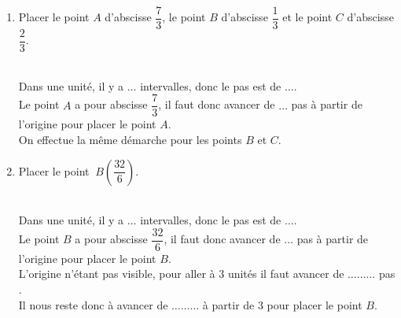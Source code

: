 \begin{Exemple}
\begin{enumerate}
\item Placer le point $A$ d'abscisse $\dfrac{7}{3}$, le point $B$ d'abscisse $\dfrac{1}{3}$ et le point $C$ d'abscisse $\dfrac{2}{3}$.


\bigskip
  \\
Dans une unité, il y a $\ldots$ intervalles, donc le pas est de $\ldots$.\\
Le point $A$ a pour abscisse $\dfrac{7}{3}$, il faut donc avancer de $\ldots$ pas à partir de l'origine pour placer le point $A$.\\On effectue la même démarche pour les points $B$ et $C$. 


\item Placer le point $~B\left(\dfrac{32}{6}\right)$.


\bigskip
   \\
Dans une unité, il y a $\ldots$ intervalles, donc le pas est de $\ldots$.\\Le point $B$ a pour abscisse $\dfrac{32}{6}$, il faut donc avancer de $\ldots$ pas à partir de l'origine pour placer le point $B$. \\
L'origine n'étant pas visible, pour aller à $3$ unités il faut avancer de $\ldots\ldots\ldots$ pas . \\Il nous reste donc à avancer de $\ldots\ldots\ldots$ à partir de $3$ pour placer le point $B$.
\end{enumerate}
\end{Exemple}

